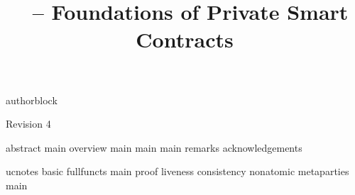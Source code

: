 \usepackage{packages}
\usepackage{contract}
\usepackage{notation}
\graphicspath{{fig/}}
\makeatletter
\newif\iffull\fulltrue
\makeatother
{authorblock}
\title{\kachina\ -- Foundations of Private Smart Contracts}


\let\oldaddcontentsline\addcontentsline
\def\addcontentsline#1#2#3{}
\maketitle
\def\addcontentsline#1#2#3{\oldaddcontentsline{#1}{#2}{#3}}
\begin{center}\footnotesize Revision 4\end{center}
\todosum

\begingroup
\renewcommand\thefootnote{\fnsymbol{footnote}}%
\renewcommand\thempfootnote{\fnsymbol{mpfootnote}}%
%
\endgroup
{abstract}
\starttoc
{main}
{overview}
{main}
{main}
{main}
{remarks}
{acknowledgements}

{}
{}


\iffull
\startappendix
{ucnotes}
{basic}
{fullfuncts}
{main}
{proof}
{liveness}
{consistency}
{nonatomic}
{metaparties}
{main}
\fi



